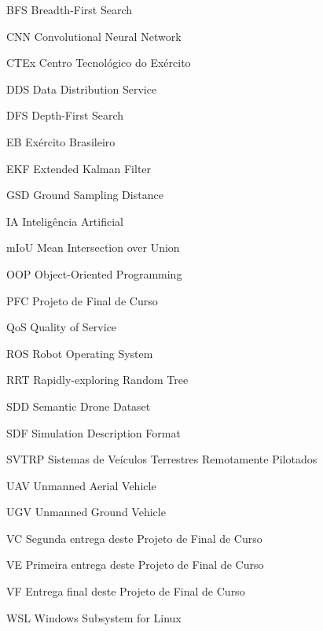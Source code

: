 \documentclass[
    12pt,
    openright,
    oneside,
    a4paper,
    english,
    brazil
]{abntex2}
\begin{document}
\listoftables*
\cleardoublepage

\begin{siglas}
    \item[BFS] Breadth-First Search
    \item[CNN] Convolutional Neural Network
    \item[CTEx] Centro Tecnológico do Exército
    \item[DDS] Data Distribution Service
    \item[DFS] Depth-First Search
    \item[EB] Exército Brasileiro
    \item[EKF] Extended Kalman Filter
    \item[GSD] Ground Sampling Distance
    \item[IA] Inteligência Artificial
    \item[mIoU] Mean Intersection over Union
    \item[OOP] Object-Oriented Programming
    \item[PFC] Projeto de Final de Curso
    \item[QoS] Quality of Service
    \item[ROS] Robot Operating System
    \item[RRT] Rapidly-exploring Random Tree
    \item[SDD] Semantic Drone Dataset
    \item[SDF] Simulation Description Format
    \item[SVTRP] Sistemas de Veículos Terrestres Remotamente Pilotados
    \item[UAV] Unmanned Aerial Vehicle
    \item[UGV] Unmanned Ground Vehicle
    \item[VC] Segunda entrega deste Projeto de Final de Curso
    \item[VE] Primeira entrega deste Projeto de Final de Curso
    \item[VF] Entrega final deste Projeto de Final de Curso
    \item[WSL] Windows Subsystem for Linux
\end{siglas}

\tableofcontents*
\cleardoublepage

\textual
\end{document}
